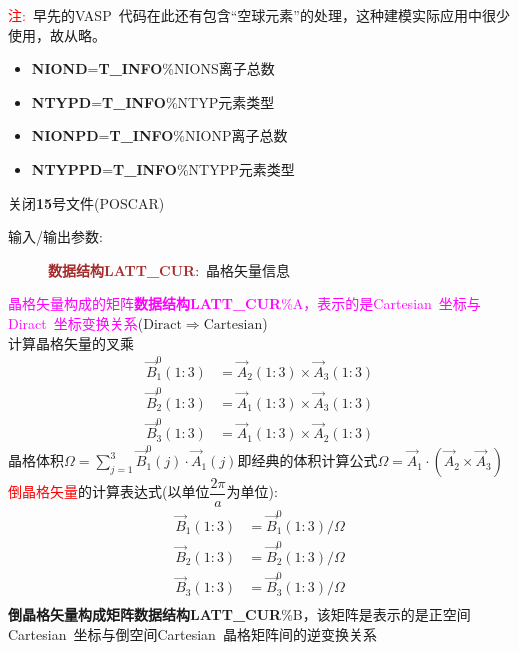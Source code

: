 \documentclass{article}      %
\begin{document}
\textcolor{red}{注:~}早先的\textrm{VASP~}代码在此还有包含“空球元素”的处理，这种建模实际应用中很少使用，故从略。
\begin{itemize}
	\item \textbf{NIOND}=\textbf{T\_INFO}\%NIONS\;\;离子总数
	\item \textbf{NTYPD}=\textbf{T\_INFO}\%NTYP\;\;元素类型
	\item \textbf{NIONPD}=\textbf{T\_INFO}\%NIONP\;\;离子总数
	\item \textbf{NTYPPD}=\textbf{T\_INFO}\%NTYPP\;\;元素类型
\end{itemize} 
关闭\textbf{15}号文件(\textrm{POSCAR})

\vskip 30pt
\begin{description}
	\item[输入/输出参数:~]\textcolor{brown}{\textbf{数据结构LATT\_CUR}}:~晶格矢量信息
\end{description}
\textcolor{magenta}{晶格矢量构成的矩阵\textbf{数据结构LATT\_CUR}\%\textrm{A}，表示的是\textrm{Cartesian}~坐标与\textrm{Diract}~坐标变换关系}($\mathrm{Diract}\Longrightarrow\mathrm{Cartesian}$)\\
计算晶格矢量的叉乘 
\begin{displaymath}
	\begin{aligned}
		\vec B_1^0(1:3)&=\vec A_2(1:3)\times\vec A_3(1:3)\\
		\vec B_2^0(1:3)&=\vec A_1(1:3)\times\vec A_3(1:3)\\
		\vec B_3^0(1:3)&=\vec A_1(1:3)\times\vec A_2(1:3)
	\end{aligned}
\end{displaymath}
晶格体积$\Omega=\sum\limits_{j=1}^3\vec B_1^0(j)\cdot\vec A_1(j)$\;\;即经典的体积计算公式$\Omega=\vec A_1\cdot(\vec A_2\times\vec A_3)$\\

\textcolor{red}{倒晶格矢量}的计算表达式(以单位$\dfrac{2\pi}a$为单位):~
\begin{displaymath}
	\begin{aligned}
		\vec B_1(1:3)&=\vec B_1^0(1:3)/\Omega\\%
		\vec B_2(1:3)&=\vec B_2^0(1:3)/\Omega\\%
		\vec B_3(1:3)&=\vec B_3^0(1:3)/\Omega\\%
	\end{aligned}
\end{displaymath}
\textbf{倒晶格矢量构成矩阵\textbf{数据结构LATT\_CUR}}\%\textrm{B}，该矩阵是表示的是正空间\textrm{Cartesian}~坐标与倒空间\textrm{Cartesian}~晶格矩阵间的逆变换关系%
\end{document}
